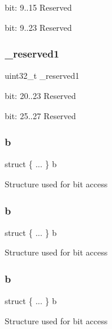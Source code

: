 bit\+: 9..15 Reserved

bit\+: 9..23 Reserved \mbox{\label{unionx_p_s_r___type_a959a73d8faee56599b7e792a7c5a2d16}} 
\subsubsection{\texorpdfstring{\_reserved1}{\_reserved1}}
{\footnotesize\ttfamily uint32\+\_\+t \+\_\+reserved1}

bit\+: 20..23 Reserved

bit\+: 25..27 Reserved \mbox{\label{unionx_p_s_r___type_a0a25c7b74ccf308a5b9c998204464bec}} 
\subsubsection{\texorpdfstring{b}{b}\hspace{0.1cm}{\footnotesize\ttfamily [1/4]}}
{\footnotesize\ttfamily struct \{ ... \}   b}

Structure used for bit access \mbox{\label{unionx_p_s_r___type_a0234c929b71272c3ff0b50d83c1bb5d4}} 
\subsubsection{\texorpdfstring{b}{b}\hspace{0.1cm}{\footnotesize\ttfamily [2/4]}}
{\footnotesize\ttfamily struct \{ ... \}   b}

Structure used for bit access \mbox{\label{unionx_p_s_r___type_a1b59d9c685f4e15edd10b7dc1eeae4c1}} 
\subsubsection{\texorpdfstring{b}{b}\hspace{0.1cm}{\footnotesize\ttfamily [3/4]}}
{\footnotesize\ttfamily struct \{ ... \}   b}

Structure used for bit access \mbox{\label{unionx_p_s_r___type_a8d8c45d946ef8df11f4cac72c667e98b}} 
